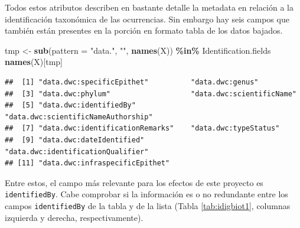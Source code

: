 \documentclass[sn-apa,pdflatex]{sn-jnl}
\newenvironment{Shaded}{\begin{snugshade}}{\end{snugshade}}
\newcommand{\AttributeTok}[1]{\textcolor[rgb]{0.13,0.29,0.53}{#1}}
\newcommand{\FunctionTok}[1]{\textcolor[rgb]{0.13,0.29,0.53}{\textbf{#1}}}
\newcommand{\NormalTok}[1]{#1}
\newcommand{\OtherTok}[1]{\textcolor[rgb]{0.56,0.35,0.01}{#1}}
\newcommand{\SpecialCharTok}[1]{\textcolor[rgb]{0.81,0.36,0.00}{\textbf{#1}}}
\newcommand{\StringTok}[1]{\textcolor[rgb]{0.31,0.60,0.02}{#1}}
\begin{document}
Todos estos atributos describen en bastante detalle la metadata en
relación a la identificación taxonómica de las ocurrencias. Sin embargo
hay seis campos que también están presentes en la porción en formato
tabla de los datos bajados.

\begin{Shaded}
\begin{Highlighting}[]
\NormalTok{tmp }\OtherTok{\textless{}{-}} \FunctionTok{sub}\NormalTok{(}\AttributeTok{pattern =} \StringTok{"data."}\NormalTok{, }\StringTok{""}\NormalTok{, }\FunctionTok{names}\NormalTok{(X)) }\SpecialCharTok{\%in\%}\NormalTok{ Identification.fields}
\FunctionTok{names}\NormalTok{(X)[tmp]}
\end{Highlighting}
\end{Shaded}

\begin{verbatim}
##  [1] "data.dwc:specificEpithet"          "data.dwc:genus"                   
##  [3] "data.dwc:phylum"                   "data.dwc:scientificName"          
##  [5] "data.dwc:identifiedBy"             "data.dwc:scientificNameAuthorship"
##  [7] "data.dwc:identificationRemarks"    "data.dwc:typeStatus"              
##  [9] "data.dwc:dateIdentified"           "data.dwc:identificationQualifier" 
## [11] "data.dwc:infraspecificEpithet"
\end{verbatim}

Entre estos, el campo más relevante para los efectos de este proyecto es
\texttt{identifiedBy}. Cabe comprobar si la información es o no
redundante entre los campos \texttt{identifiedBy} de la tabla y de la
lista (Tabla \ref{tab:idigbiot1}, columnas izquierda y derecha,
respectivamente).

\begingroup\fontsize{5}{7}\selectfont
\end{document}
